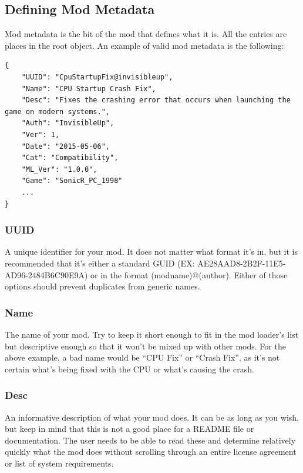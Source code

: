 \documentclass[12pt,a4paper,notitlepage]{article}
\begin{document}
\subsection{Defining Mod Metadata}
\label{subsec:create-meta}
Mod metadata is the bit of the mod that defines what it is. All the entries are places in the root object. An example of valid mod metadata is the following:

\begin{lstlisting}[breaklines=true]
{
	"UUID": "CpuStartupFix@invisibleup",
	"Name": "CPU Startup Crash Fix",
	"Desc": "Fixes the crashing error that occurs when launching the game on modern systems.",
	"Auth": "InvisibleUp",
	"Ver": 1,
	"Date": "2015-05-06",
	"Cat": "Compatibility",
	"ML_Ver": "1.0.0",
	"Game": "SonicR_PC_1998"
	...
}

\end{lstlisting}

\subsubsection{UUID}
\label{subsubsec:create-meta-uuid}
A unique identifier for your mod. It does not matter what format it's in, but it is recommended that it's either a standard GUID (EX: {AE28AAD8-2B2F-11E5-AD96-2484B6C90E9A}) or in the format (modname)@(author). Either of those options should prevent duplicates from generic names.

\subsubsection{Name}
\label{subsubsec:create-meta-name}
The name of your mod. Try to keep it short enough to fit in the mod loader's list but descriptive enough so that it won't be mixed up with other mods. For the above example, a bad name would be ``CPU Fix'' or ``Crash Fix'', as it's not certain what's being fixed with the CPU or what's causing the crash.

\subsubsection{Desc}
\label{subsubsec:create-meta-desc}
An informative description of what your mod does. It can be as long as you wish, but keep in mind that this is not a good place for a README file or documentation. The user needs to be able to read these and determine relatively quickly what the mod does without scrolling through an entire license agreement or list of system requirements.
\end{document}
